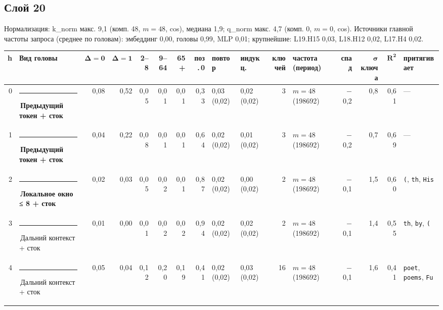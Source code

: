 \documentclass[10pt]{article}
\begin{document}
\noindent\begin{minipage}{\linewidth}
\subsection*{Слой 20}
{\small\color{ink2} Нормализация: k\_norm макс. 9,1 (комп. 48, $m{=}48$, cos), медиана 1,9; q\_norm макс. 4,7 (комп. 0, $m{=}0$, cos). Источники главной частоты запроса (среднее по головам): эмбеддинг 0,00, головы 0,99, MLP 0,01; крупнейшие: L19.H15 0,03, L18.H12 0,02, L17.H4 0,02.}
\begin{center}{\footnotesize\begin{tabular}{|r|l|r|r|r|r|r|r|l|l|r|l|r|r|r|l|}
\hline
\rowcolor{head}\textbf{h} & \textbf{Вид головы} & $\boldsymbol{\Delta{=}0}$ & $\boldsymbol{\Delta{=}1}$ & \textbf{2–8} & \textbf{9–64} & \textbf{65+} & \textbf{поз.\,0} & \textbf{повтор} & \textbf{индукц.} & \textbf{ключей} & \textbf{частота (период)} & \textbf{спад} & $\boldsymbol{\sigma}$ \textbf{ключа} & $\boldsymbol{R^2}$ & \textbf{притягивает} \\ \hline
0 & \textcolor[HTML]{2A78D6}{\rule{0.62em}{0.62em}}\,\textbf{Предыдущий токен + сток} & 0,08 & 0,52 & 0,05 & 0,01 & 0,01 & 0,33 & 0,03 (0,02) & 0,02 (0,02) & 3 & $m{=}48$ (198692) & $-$0,2 & 0,8 & 0,61 & — \\ \hline
1 & \textcolor[HTML]{2A78D6}{\rule{0.62em}{0.62em}}\,\textbf{Предыдущий токен + сток} & 0,04 & 0,22 & 0,08 & 0,01 & 0,01 & 0,64 & 0,02 (0,02) & 0,01 (0,02) & 3 & $m{=}48$ (198692) & $-$0,2 & 0,7 & 0,69 & — \\ \hline
2 & \textcolor[HTML]{1BAF7A}{\rule{0.62em}{0.62em}}\,\textbf{Локальное окно ≤ 8 + сток} & 0,02 & 0,03 & 0,05 & 0,02 & 0,01 & 0,87 & 0,02 (0,02) & 0,00 (0,02) & 2 & $m{=}48$ (198692) & $-$0,1 & 1,5 & 0,60 & \texttt{\textvisiblespace{}(}, \texttt{th}, \texttt{\textvisiblespace{}His} \\ \hline
3 & \textcolor[HTML]{C3C2B7}{\rule{0.62em}{0.62em}}\,Дальний контекст + сток & 0,01 & 0,00 & 0,01 & 0,02 & 0,02 & 0,94 & 0,02 (0,02) & 0,02 (0,02) & 2 & $m{=}48$ (198692) & $-$0,1 & 1,4 & 0,55 & \texttt{th}, \texttt{\textvisiblespace{}by}, \texttt{\textvisiblespace{}(} \\ \hline
4 & \textcolor[HTML]{C3C2B7}{\rule{0.62em}{0.62em}}\,Дальний контекст + сток & 0,05 & 0,04 & 0,12 & 0,20 & 0,19 & 0,41 & 0,02 (0,02) & 0,03 (0,02) & 16 & $m{=}48$ (198692) & $-$0,1 & 1,6 & 0,41 & \texttt{\textvisiblespace{}poet}, \texttt{\textvisiblespace{}poems}, \texttt{\textvisiblespace{}Fu} \\ \hline

\end{tabular}}
\end{center}
\end{minipage}
\end{document}
